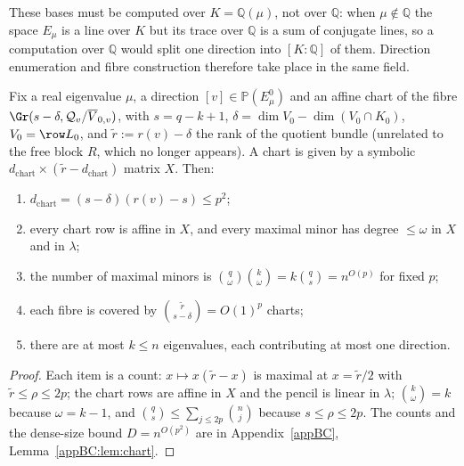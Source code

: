 \begin{remark}\label{sec5:rem:sameK}
These bases must be computed over $K=\mathbb{Q}(\mu)$, not over $\mathbb{Q}$: when $\mu\notin\mathbb{Q}$
the space $E_\mu$ is a line over $K$ but its trace over $\mathbb{Q}$ is a sum of conjugate lines, so a
computation over $\mathbb{Q}$ would split one direction into $[K:\mathbb{Q}]$ of them. Direction
enumeration and fibre construction therefore take place in the same field.
\end{remark}

\begin{lem}\label{sec5:sub:chart}\label{sec5:lem:chart}
Fix a real eigenvalue $\mu$, a direction $[v]\in\mathbb{P}(E_\mu^0)$ and an affine chart of the fibre
$\Gr(s-\delta,\mathcal{Q}_v/\overline{V}_{0,v})$, with $s=q-k+1$,
$\delta=\dim V_0-\dim(V_0\cap K_0)$, $V_0=\row L_0$, and $\widetilde r:=r(v)-\delta$ the rank of the
quotient bundle (unrelated to the free block $R$, which no longer appears). A chart is given by a
symbolic $d_{\mathrm{chart}}\times(\widetilde r-d_{\mathrm{chart}})$ matrix $X$. Then:
\begin{enumerate}[label=(\roman*),leftmargin=*]
\item $d_{\mathrm{chart}}=(s-\delta)(r(v)-s)\le p^{2}$;
\item every chart row is affine in $X$, and every maximal minor has degree $\le\omega$ in $X$ and in
$\lambda$;
\item the number of maximal minors is $\binom{q}{\omega}\binom{k}{\omega}=k\binom{q}{s}=n^{O(p)}$ for
fixed $p$;
\item each fibre is covered by $\binom{\widetilde r}{s-\delta}=O(1)^{p}$ charts;
\item there are at most $k\le n$ eigenvalues, each contributing at most one direction.
\end{enumerate}
\end{lem}

\begin{proof}
Each item is a count: $x\mapsto x(\widetilde r-x)$ is maximal at $x=\widetilde r/2$ with
$\widetilde r\le\rho\le2p$; the chart rows are affine in $X$ and the pencil is linear in $\lambda$;
$\binom{k}{\omega}=k$ because $\omega=k-1$, and $\binom{q}{s}\le\sum_{j\le2p}\binom{n}{j}$ because
$s\le\rho\le2p$. The counts and the dense-size bound $D=n^{O(p^{2})}$ are in Appendix~\ref{appBC},
Lemma~\ref{appBC:lem:chart}.
\end{proof}

